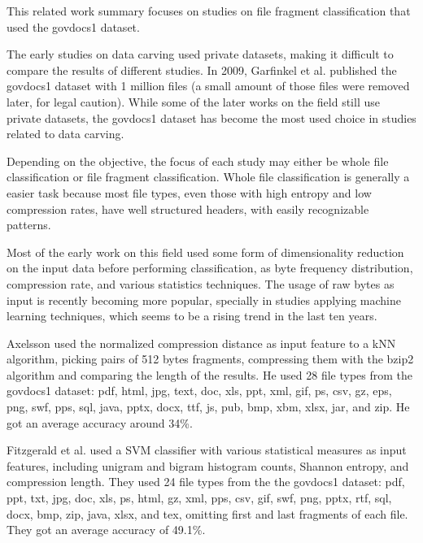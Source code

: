 This related work summary focuses on studies on file fragment classification that used the govdocs1 dataset\cite{garfinkel_bringing_2009}.

The early studies on data carving used private datasets, making it difficult to compare the results of different studies. In 2009, Garfinkel et al. \cite{garfinkel_bringing_2009} published the govdocs1 dataset with 1 million files (a small amount of those files were removed later, for legal caution). While some of the later works on the field still use private datasets, the govdocs1 dataset has become the most used choice in studies related to data carving.

Depending on the objective, the focus of each study may either be whole file classification or file fragment classification. Whole file classification is generally a easier task because most file types, even those with high entropy and low compression rates, have well structured headers, with easily recognizable patterns.

Most of the early work on this field used some form of dimensionality reduction on the input data before performing classification, as byte frequency distribution, compression rate, and various statistics techniques. The usage of raw bytes as input is recently becoming more popular, specially in studies applying machine learning techniques, which seems to be a rising trend in the last ten years.


Axelsson \cite{axelsson_normalised_2010}
used the normalized compression distance as input feature to a kNN algorithm,
picking pairs of 512 bytes fragments, compressing them with the bzip2 algorithm
and comparing the length of the results. He used 28 file types from the govdocs1 dataset: pdf, html, jpg, text, doc, xls,
ppt, xml, gif, ps, csv, gz, eps, png, swf, pps, sql, java, pptx, docx, ttf,
js, pub, bmp, xbm, xlsx, jar, and zip.
He got an average accuracy around 34\%.


Fitzgerald et al. \cite{fitzgerald_using_2012}  
used a SVM classifier with various statistical measures as input features, including unigram and bigram histogram counts, Shannon entropy, and compression length.
They used 24 file types from the the govdocs1 dataset: pdf, ppt, txt, jpg, doc, xls, ps, html, gz, xml, pps, csv, gif, swf, png, pptx, rtf, sql, docx, bmp, zip, java, xlsx, and tex, omitting first and last fragments of each file.
They got an average accuracy of 49.1\%.

